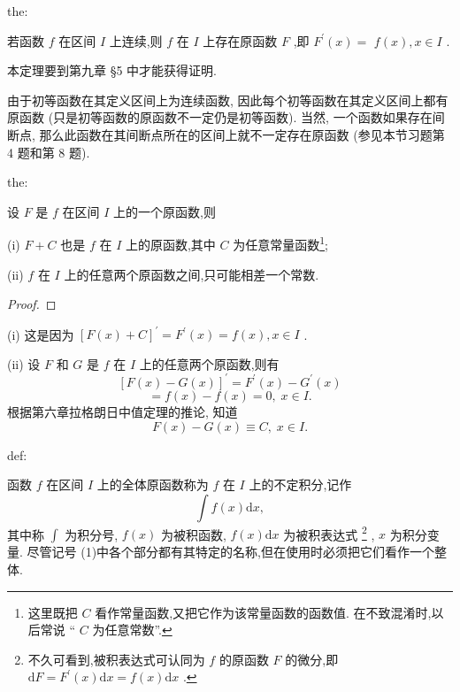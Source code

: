 \begin{theorem}{}{the:}

\end{theorem}
 若函数 \(f\) 在区间 \(I\) 上连续,则 \(f\) 在 \(I\) 上存在原函数 \(F\) ,即 \({F}^{\prime }\left( x\right)  =\)  \(f\left( x\right) ,x \in  I\) .

本定理要到第九章 §5 中才能获得证明.

由于初等函数在其定义区间上为连续函数, 因此每个初等函数在其定义区间上都有原函数 (只是初等函数的原函数不一定仍是初等函数). 当然, 一个函数如果存在间断点, 那么此函数在其间断点所在的区间上就不一定存在原函数 (参见本节习题第 4 题和第 8 题).

\begin{theorem}{}{the:}

\end{theorem}
 设 \(F\) 是 \(f\) 在区间 \(I\) 上的一个原函数,则

(i) \(F + C\) 也是 \(f\) 在 \(I\) 上的原函数,其中 \(C\) 为任意常量函数\footnote{这里既把 \(C\) 看作常量函数,又把它作为该常量函数的函数值. 在不致混淆时,以后常说 “ \(C\) 为任意常数”.};

(ii) \(f\) 在 \(I\) 上的任意两个原函数之间,只可能相差一个常数.

\begin{proof}

\end{proof}
(i) 这是因为 \({\left\lbrack  F\left( x\right)  + C\right\rbrack  }^{\prime } = {F}^{\prime }\left( x\right)  = f\left( x\right) ,x \in  I\) .

(ii) 设 \(F\) 和 \(G\) 是 \(f\) 在 \(I\) 上的任意两个原函数,则有
\[
{\left\lbrack  F\left( x\right)  - G\left( x\right) \right\rbrack  }^{\prime } = {F}^{\prime }\left( x\right)  - {G}^{\prime }\left( x\right)
\]
\[
= f\left( x\right)  - f\left( x\right)  = 0,\;x \in  I.
\]
根据第六章拉格朗日中值定理的推论, 知道
\[
F\left( x\right)  - G\left( x\right)  \equiv  C,\;x \in  I.
\]
\begin{definition}{}{def:}

\end{definition}
函数 \(f\) 在区间 \(I\) 上的全体原函数称为 \(f\) 在 \(I\) 上的不定积分,记作
\[
\int f\left( x\right) \mathrm{d}x, \tag{1}
\]
其中称 \(\int\) 为积分号, \(f\left( x\right)\) 为被积函数, \(f\left( x\right) \mathrm{d}x\) 为被积表达式 \footnote{不久可看到,被积表达式可认同为 \(f\) 的原函数 \(F\) 的微分,即 \(\mathrm{d}F = {F}^{\prime }\left( x\right) \mathrm{d}x = f\left( x\right) \mathrm{d}x\) .} , \(x\) 为积分变量. 尽管记号 (1)中各个部分都有其特定的名称,但在使用时必须把它们看作一个整体.

